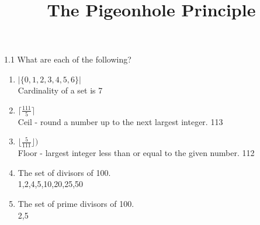 \documentclass{article}
\title{The Pigeonhole Principle}
\date{}
\begin{document}
1.1 What are each of the following?

\begin{enumerate}
    \item \( |\{0,1,2,3,4,5,6\}| \)
    \\Cardinality of a set is 7
    
    \item \( \lceil \frac{111}{5}\rceil \)
    \\Ceil - round a number up to the next largest integer. 113
    
    \item \( \lfloor \frac{5}{111} \rfloor ) \)
    \\Floor - largest integer less than or equal to the given number. 112
    
    \item The set of divisors of 100.
    \\1,2,4,5,10,20,25,50
    
    \item The set of prime divisors of 100.
    \\2,5
\end{enumerate}
\end{document}
